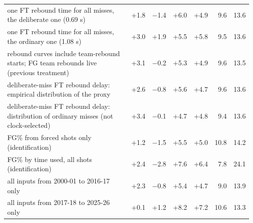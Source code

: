 \begin{tabular}{p{7.4cm}rrrrrr}
one FT rebound time for all misses, the deliberate one (0.69 s) & +1.8 & $-$1.4 & +6.0 & +4.9 & 9.6 & 13.6 \\
one FT rebound time for all misses, the ordinary one (1.08 s) & +3.0 & +1.9 & +5.5 & +5.8 & 9.5 & 13.6 \\
rebound curves include team-rebound starts; FG team rebounds live (previous treatment) & +3.1 & $-$0.2 & +5.3 & +4.9 & 9.6 & 13.5 \\
deliberate-miss FT rebound delay: empirical distribution of the proxy & +2.6 & $-$0.8 & +5.6 & +4.7 & 9.6 & 13.6 \\
deliberate-miss FT rebound delay: distribution of ordinary misses (not clock-selected) & +3.4 & $-$0.1 & +4.7 & +4.8 & 9.4 & 13.6 \\
FG\% from forced shots only (identification) & +1.2 & $-$1.5 & +5.5 & +5.0 & 10.8 & 14.2 \\
FG\% by time used, all shots (identification) & +2.4 & $-$2.8 & +7.6 & +6.4 & 7.8 & 24.1 \\
all inputs from 2000-01 to 2016-17 only & +2.3 & $-$0.8 & +5.4 & +4.7 & 9.0 & 13.9 \\
all inputs from 2017-18 to 2025-26 only & +0.1 & +1.2 & +8.2 & +7.2 & 10.6 & 13.3 \\
\bottomrule
\end{tabular}

